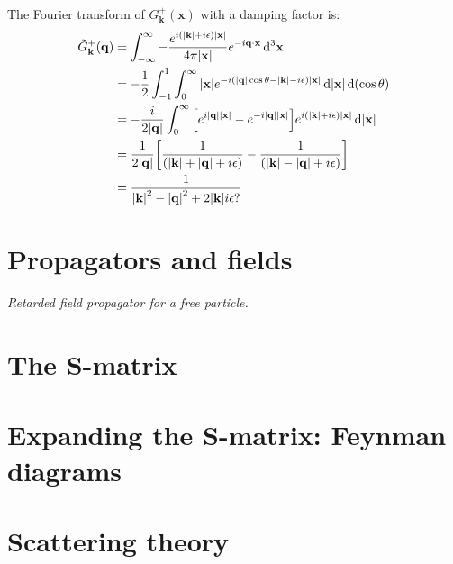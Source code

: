 \documentclass{report}
\begin{document}
\begin{subquests}
\begin{subquests}
		\item The Fourier transform of $G^+_{\mathbf k}(\mathbf x)$ with a damping factor is:
		\begin{align*}
			\tilde G^+_{\mathbf k}(\vb q) & = \int_{-\infty}^{\infty} -\frac{e^{i\pqty{\abs{\mathbf k} + i\epsilon}\abs{\mathbf x}}}{4\pi\abs{\mathbf x}}e^{-i\vb q\cdot \vb x}\,\dd^3{\vb x} \\ 
			& = -\frac{1}{2}\int_{-1}^{1}\int_0^{\infty}{\abs{\mathbf x}e^{-i\pqty{\abs{\vb q}\cos\theta -\abs{\mathbf k} - i\epsilon}\abs{\mathbf x}}} \dd{\abs{\mathbf x}}\dd\pqty{\cos\theta} \\
			& = -\frac{i}{2\abs{\vb q}}\int_{0}^{\infty} \bqty{e^{i\abs{\vb q}\abs{\mathbf x}}- e^{-i\abs{\vb q}\abs{\mathbf x}}}e^{i\pqty{\abs{\mathbf k} + i\epsilon}\abs{\mathbf x}} \dd{\abs{\mathbf x}} \\
			& = \frac{1}{2\abs{\vb q}}\bqty{\frac{1}{\pqty{\abs{\vb k} + \abs{\vb q} + i\epsilon}}- \frac{1}{ \pqty{\abs{\vb k} - \abs{\vb q} + i\epsilon}}} \\ 
			& = \frac{1}{\abs{\vb k}^2 - \abs{\vb q}^2 + 2\abs{\vb k}i\epsilon?}
		\end{align*}

		\item
	\end{subquests}
\end{subquests}


\chapter{Propagators and fields}

\begin{subquests}
	\item \emph{Retarded field propagator for a free particle.}

\end{subquests}

\chapter{The S-matrix}

\chapter{Expanding the S-matrix: Feynman diagrams}

\chapter{Scattering theory}
\end{document}
